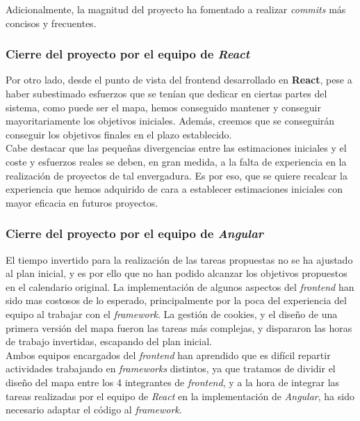 \documentclass[11pt, a4paper, titlepage]{article}
\begin{document}
Adicionalmente, la magnitud del proyecto ha fomentado a realizar \textit{commits} más concisos y frecuentes. \\

\subsubsection{Cierre del proyecto por el equipo de \textit{React}}
Por otro lado, desde el punto de vista del frontend desarrollado en \textbf{React}, pese a haber subestimado esfuerzos que se tenían que dedicar en ciertas partes del sistema, como puede ser el mapa, hemos conseguido mantener y conseguir mayoritariamente los objetivos iniciales. Además, creemos que se conseguirán conseguir los objetivos finales en el plazo establecido. \\

Cabe destacar que las pequeñas divergencias entre las estimaciones iniciales y el coste y esfuerzos reales se deben, en gran medida, a la falta de experiencia en la realización de proyectos de tal envergadura. Es por eso, que se quiere recalcar la experiencia que hemos adquirido de cara a establecer estimaciones iniciales con mayor eficacia en futuros proyectos. \\


\subsubsection{Cierre del proyecto por el equipo de \textit{Angular}}

El tiempo invertido para la realización de las tareas propuestas no se ha ajustado al plan inicial, y es por ello que no han podido alcanzar los objetivos propuestos en el calendario original. La implementación de algunos aspectos del \textit{frontend} han sido mas costosos de lo esperado, principalmente por la poca del experiencia del equipo al trabajar con el \textit{framework}. La gestión de cookies, y el diseño de una primera versión del mapa fueron las tareas más complejas, y dispararon las horas de trabajo invertidas, escapando del plan inicial.
\\

Ambos equipos encargados del \textit{frontend} han aprendido que es difícil repartir actividades trabajando en \textit{frameworks} distintos, ya que tratamos de dividir el diseño del mapa entre los 4 integrantes de \textit{frontend}, y a la hora de integrar las tareas realizadas por el equipo de \textit{React} en la implementación de \textit{Angular}, ha sido necesario adaptar el código al \textit{framework}. \\
\end{document}
